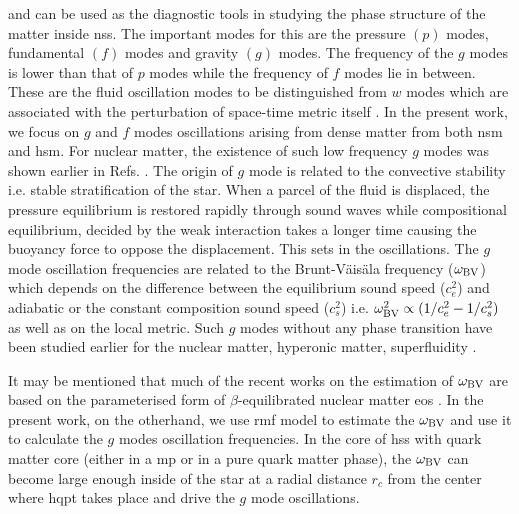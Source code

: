 \documentclass[a4paper, 11pt]{article}
\begin{document}
 and can be used as the diagnostic tools in studying the phase structure of the matter inside \ac{ns}s. The important modes for this are the pressure $(p)$ modes, fundamental $(f)$ modes and gravity $(g)$ modes. The frequency of the $g$ modes is lower than that of $p$ modes while the frequency of $f$ modes lie in between. These are the fluid oscillation modes to be distinguished from $w$ modes which are associated with the perturbation of space-time metric itself \cite{Andersson:1997rn}. In the present work, we focus on $g$ and $f$ modes oscillations arising from dense matter from both \ac{nsm} and \ac{hsm}. For nuclear matter, the existence of such low frequency $g$ modes was shown earlier in Refs. \cite{McDermott:1983, Goldreich:1994}. The origin of $g$ mode is related to the convective stability i.e. stable stratification of the star. When a parcel of the fluid is displaced, the pressure equilibrium is restored rapidly through sound waves while compositional equilibrium, decided by the weak interaction takes a longer time causing the buoyancy force to oppose the displacement. This sets in the oscillations. The $g$ mode oscillation frequencies are related to the Brunt-V\"ais\"ala frequency ($\omega_{\rm BV}$) which depends on the difference between the equilibrium sound speed ($c_e^2$) and adiabatic or the constant composition sound speed ($c_s^2$) i.e. $\omega_{\rm BV}^2 \propto (1/c_e^2-1/c_s^2)$ as well as on the local metric. Such $g$ modes without any phase transition have been studied earlier for the nuclear matter, hyperonic matter, superfluidity \cite{Lee:1996rx, Prix:2002fk, Andersson:2001bz, Gusakov:2013eoa, Gualtieri:2014lsa, Dommes:2015, Kantor:2014lja, Passamonti:2015oia, Yu:2016ltf, Yu:2017cxe, Rau:2018wdw}.

It may be mentioned that much of the recent works on the estimation of $\omega_{\rm BV}$ are based on the parameterised form of $\beta$-equilibrated nuclear matter \ac{eos} \cite{Flores:2013, Jaikumar:2021jbw}. In the present work, on the otherhand, we use \ac{rmf} model to estimate the $\omega_{\rm BV}$ and use it to calculate the $g$ modes oscillation frequencies. In the core of \ac{hs}s with quark matter core (either in a \ac{mp} or in a pure quark matter phase), the $\omega_{\rm BV}$ can become large enough inside of the star at a radial distance $r_c$ from the center where \ac{hqpt} takes place and drive the $g$ mode oscillations.
\end{document}
